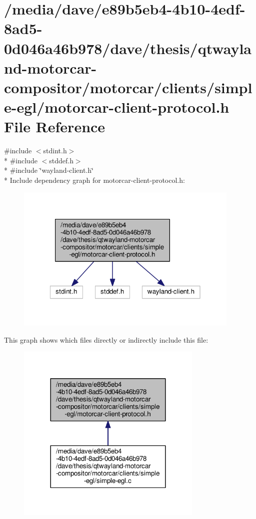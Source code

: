 \hypertarget{clients_2simple-egl_2motorcar-client-protocol_8h}{\section{/media/dave/e89b5eb4-\/4b10-\/4edf-\/8ad5-\/0d046a46b978/dave/thesis/qtwayland-\/motorcar-\/compositor/motorcar/clients/simple-\/egl/motorcar-\/client-\/protocol.h File Reference}
\label{clients_2simple-egl_2motorcar-client-protocol_8h}
}
{\ttfamily \#include $<$stdint.\-h$>$}\\*
{\ttfamily \#include $<$stddef.\-h$>$}\\*
{\ttfamily \#include \char`\"{}wayland-\/client.\-h\char`\"{}}\\*
Include dependency graph for motorcar-\/client-\/protocol.h\-:\nopagebreak
\begin{figure}[H]
\begin{center}
\leavevmode
\includegraphics[width=304pt]{clients_2simple-egl_2motorcar-client-protocol_8h__incl}
\end{center}
\end{figure}
This graph shows which files directly or indirectly include this file\-:\nopagebreak
\begin{figure}[H]
\begin{center}
\leavevmode
\includegraphics[width=252pt]{clients_2simple-egl_2motorcar-client-protocol_8h__dep__incl}
\end{center}
\end{figure}
